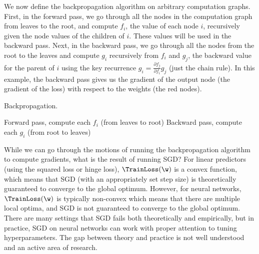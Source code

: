 

We now define the backpropagation algorithm on arbitrary computation graphs.
%
First, in the forward pass, we go through all the nodes in the computation graph from leaves to the root,
%
and compute $f_i$, the value of each node $i$,
%
recursively given the node values of the children of $i$. These values will be used in the backward pass.
%
Next, in the backward pass, we go through all the nodes from the root to the leaves and compute $g_i$ recursively from $f_i$ and $g_j$,
%
the backward value for the parent of $i$ using the key recurrence $g_i = \frac{\partial f_j}{\partial f_i} g_j$ (just the chain rule).
%
In this example, the backward pass gives us the gradient of the output node (the gradient of the loss) with respect to the weights (the red nodes).

\begin{algorithm}[ht]
  \caption{Backpropagation.}
  \begin{algorithmic}
	\State Forward pass, compute each $f_i$ (from leaves to root)
	\State Backward pass, compute each $g_i$ (from root to leaves)
  \EndFunction
  \end{algorithmic}
\end{algorithm}


While we can go through the motions of running the backpropagation algorithm to compute gradients,
%
what is the result of running SGD?
%
For linear predictors (using the squared loss or hinge loss),
%
$\TrainLoss(\w)$ is a convex function,
%
which means that SGD (with an appropriately set step size)
%
is theoretically guaranteed to converge to the global optimum.
%
However, for neural networks,
%
$\TrainLoss(\w)$ is typically non-convex
%
which means that there are multiple local optima,
%
and SGD is not guaranteed to converge to the global optimum.
%
There are many settings that SGD fails both theoretically and empirically,
%
but in practice, SGD on neural networks can work with proper attention to tuning hyperparameters.
%
The gap between theory and practice is not well understood and an active area of research.


